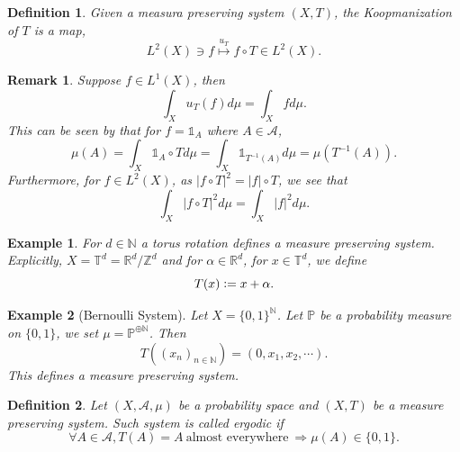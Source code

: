 \documentclass[8pt]{article}
\newtheorem{definition}{Definition}[section]
\newtheorem{remark}{Remark}[section]
\newtheorem{example}{Example}[section]
\newcommand{\alev}[0]{\:\text{almost everywhere}\:}
\newcommand{\ab}[1]{\vert #1 \vert}
\newcommand{\defeq}{\vcentcolon=}
\newcommand{\bN}[0]{\mathbb{N}}
\newcommand{\bR}[0]{\mathbb{R}}
\newcommand{\bZ}[0]{\mathbb{Z}}
\newcommand{\bT}[0]{\mathbb{T}}
\begin{document}
\begin{definition}
  \label{definition_4_2}
  Given a measura preserving system $(X,T)$, the Koopmanization of $T$ is a map,
  \begin{equation*}
    L^2(X)\ni f\stackrel{u_T}{\mapsto} f\circ T\in L^2(X).
  \end{equation*}
\end{definition}

\begin{remark}
  \label{remark_4_1}
  Suppose $f\in L^1(X)$, then 
  \begin{equation*}
    \int_X u_T(f)d\mu = \int_X fd\mu.
  \end{equation*}
  This can be seen by that for $f = \mathds{1}_A$ where $A\in\mathcal{A}$,
  \begin{equation*}
    \mu(A) = \int_X \mathds{1}_A\circ Td\mu = \int_X \mathds{1}_{T^{-1}(A)}d\mu = \mu(T^{-1}(A)).
  \end{equation*}
  Furthermore, for $f\in L^2(X)$, as $\ab{f\circ T}^2 = \ab{f}\circ T$, we see that 
  \begin{equation*}
    \int_X\ab{f\circ T}^2d\mu = \int_X\ab{f}^2d\mu.
  \end{equation*}
\end{remark}

\begin{example}
  \label{example_4_1}
  For $d\in\bN$ a torus rotation defines a measure preserving system. Explicitly, $X=\bT^d = \bR^d/\bZ^d$ and for $\alpha\in\bR^d$, for $x\in\bT^d$, we define 
  \begin{equation*}
    T(x)\defeq x+\alpha.
  \end{equation*}
\end{example}

\begin{example}[Bernoulli System]
  \label{example_4_2}
  Let $X=\{0,1\}^\bN$. Let $\mathbb{P}$ be a probability measure on $\{0,1\}$, we set $\mu = \mathbb{P}^{\oplus \bN}$. Then 
  \begin{equation*}
    T((x_n)_{n\in\bN}) = (0,x_1,x_2,\cdots).
  \end{equation*}
  This defines a measure preserving system.
\end{example}

\begin{definition}
  \label{definition_4_3}
  Let $(X,\mathcal{A},\mu)$ be a probability space and $(X,T)$ be a measure preserving system. 
  Such system is called ergodic if 
  \begin{equation*}
    \forall A\in\mathcal{A}, T(A) = A \alev \Rightarrow \mu(A)\in\{0,1\}.
  \end{equation*}
\end{definition}
\end{document}
